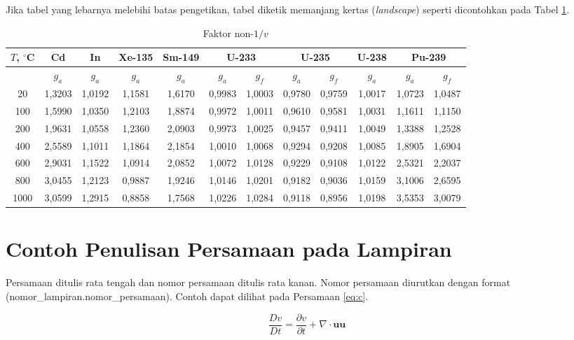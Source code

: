 Jika tabel  yang lebarnya melebihi batas pengetikan, tabel diketik memanjang kertas (\textit{landscape}) seperti dicontohkan pada Tabel \ref{tbl: non-v1}.

\begin{table}
 \centering
 \caption{Faktor non-$1/v$}
  \begin{center}
\begin{tabular}{|c|c|c|c|c|c|c|c|c|c|c|c|}
\hline

$T$, $^\circ$C & Cd & In & Xe-135 & Sm-149 & \multicolumn{2}{|c|}{U-233} & \multicolumn{2}{|c|}{U-235}  & U-238 & \multicolumn{2}{|c|}{Pu-239} \\ 
\hline
     & $g_a$ & $g_a$& $g_a$ & $g_a$ & $g_a$ & $g_f$ & $g_a$ & $g_f$ & $g_a$  & $g_a$ & $g_f$ \\ 
20   & 1,3203 & 1,0192 & 1,1581 & 1,6170 & 0,9983 & 1,0003 & 0,9780 & 0,9759 & 1,0017 & 1,0723 & 1,0487  \\
100  & 1,5990 & 1,0350 & 1,2103 & 1,8874 & 0,9972 & 1,0011 & 0,9610 & 0,9581 & 1,0031 & 1,1611 & 1,1150  \\
200  & 1,9631 & 1,0558 & 1,2360 & 2,0903 & 0,9973 & 1,0025 & 0,9457 & 0,9411 & 1,0049 & 1,3388 & 1,2528 \\
400  & 2,5589 & 1,1011 & 1,1864 & 2,1854 & 1,0010 & 1,0068 & 0,9294 & 0,9208 & 1,0085 & 1,8905 & 1,6904 \\
600  & 2,9031 & 1,1522 & 1,0914 & 2,0852 & 1,0072 & 1,0128 & 0,9229 & 0,9108 & 1,0122 & 2,5321 & 2,2037 \\
800  & 3,0455 & 1,2123 & 0,9887 & 1,9246 & 1,0146 & 1,0201 & 0,9182 & 0,9036 & 1,0159 & 3,1006 & 2,6595 \\
1000 & 3,0599 & 1,2915 & 0,8858 & 1,7568 & 1,0226 & 1,0284 & 0,9118 & 0,8956 & 1,0198 & 3,5353 & 3,0079 \\
\hline
  \end{tabular}
  \end{center}

 \label{tbl: non-v1}
\end{table}



\section{Contoh Penulisan Persamaan pada Lampiran}

Persamaan ditulis rata tengah dan nomor persamaan ditulis rata kanan. Nomor persamaan
diurutkan dengan format (nomor\_lampiran.nomor\_persamaan). Contoh dapat dilihat pada Persamaan \eqref{eq:c}.

\begin{equation}
    \dfrac{Dv}{Dt} = \dfrac{\partial v}{\partial t} + \nabla \cdot \mathbf{uu}
\label{eq:c}
\end{equation}